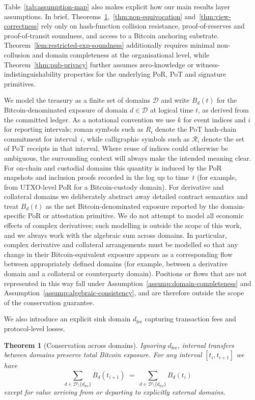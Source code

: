 \documentclass[11pt]{article}
\newtheorem{theorem}{Theorem}
\begin{document}
Table~\ref{tab:assumption-map} also makes explicit how our main results layer assumptions. In brief, Theorems~\ref{thm:conservation},~\ref{thm:non-equivocation} and~\ref{thm:view-correctness} rely only on hash-function collision resistance, proof-of-reserves and proof-of-transit soundness, and access to a Bitcoin anchoring substrate. Theorem~\ref{lem:restricted-exp-soundness} additionally requires minimal non-collusion and domain completeness at the organisational level, while Theorem~\ref{thm:pub-privacy} further assumes zero-knowledge or witness-indistinguishability properties for the underlying PoR, PoT and signature primitives.

We model the treasury as a finite set of domains $\mathcal{D}$ and write
$B_d(t)$ for the Bitcoin-denominated exposure of domain $d \in \mathcal{D}$ at
logical time $t$, as derived from the committed ledger.
As a notational convention we use $k$ for event indices and $i$ for reporting intervals; roman symbols such as
$R_i$ denote the PoT hash-chain commitment for interval~$i$, while calligraphic symbols such as $\mathcal{R}_i$
denote the set of PoT receipts in that interval.
Where reuse of indices could otherwise be ambiguous, the surrounding context will always make the intended
meaning clear.
For on-chain and custodial domains this quantity is induced by the PoR snapshots and inclusion proofs recorded in the log up to time~$t$ (for example, from UTXO-level PoR for a Bitcoin-custody domain).
For derivative and collateral domains we deliberately abstract away detailed contract semantics and treat $B_d(t)$ as the net Bitcoin-denominated exposure reported by the domain-specific PoR or attestation primitive.
We do not attempt to model all economic effects of complex derivatives; such modelling is outside the scope of this work, and we always work with the algebraic sum across domains.
In particular, complex derivative and collateral arrangements must be modelled so that any change in their
Bitcoin-equivalent exposure appears as a corresponding flow between appropriately defined domains (for example,
between a derivative domain and a collateral or counterparty domain). Positions or flows that are not represented
in this way fall under Assumption~\ref{assump:domain-completeness} and Assumption~\ref{assump:algebraic-consistency},
and are therefore outside the scope of the conservation guarantee.

We also introduce an explicit sink domain $d_{\mathrm{fee}}$ capturing
transaction fees and protocol-level losses.

\begin{theorem}[Conservation across domains]
\label{thm:conservation}
Ignoring $d_{\mathrm{fee}}$, internal transfers between domains preserve total
Bitcoin exposure.
For any interval $[t_i,t_{i+1}]$ we have
\[
  \sum_{d \in \mathcal{D} \setminus \{d_{\mathrm{fee}}\}} B_d(t_{i+1})
  \;=\;
  \sum_{d \in \mathcal{D} \setminus \{d_{\mathrm{fee}}\}} B_d(t_i)
\]
except for value arriving from or departing to explicitly external domains.
\end{theorem}
\end{document}
